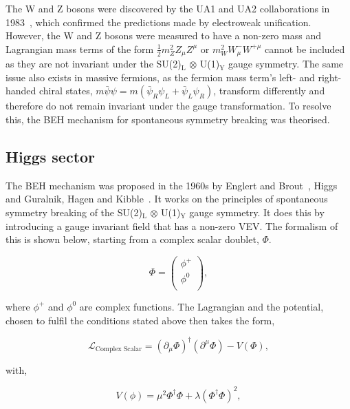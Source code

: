 The W and Z bosons were discovered by the UA1 and UA2 collaborations in 1983~\cite{UA1:1983crd,UA2:1983tsx}, which confirmed the predictions made by electroweak unification.
However, the W and Z bosons were measured to have a non-zero mass and Lagrangian mass terms of the form $\frac{1}{2}m_{Z}^2 Z_{\mu} Z^{\mu}$ or $m_{W}^2 W_{\mu}^{-}W^{+\mu}$ cannot be included as they are not invariant under the SU(2)$_{\text{L}}$ $\otimes$ U(1)$_{\text{Y}}$ gauge symmetry.
The same issue also exists in massive fermions, as the fermion mass term's left- and right-handed chiral states, $m\bar{\psi}\psi = m(\bar{\psi}_R \psi_L + \bar{\psi}_L \psi_R)$,  transform differently and therefore do not remain invariant under the gauge transformation.
To resolve this, the \ac{BEH} mechanism for spontaneous symmetry breaking was theorised.

\subsection{Higgs sector}

The \ac{BEH} mechanism was proposed in the 1960s by Englert and Brout~\cite{Englert:1964et}, Higgs~\cite{Higgs:1964ia,Higgs:1964pj,Higgs:1966ev} and Guralnik, Hagen and Kibble~\cite{Guralnik:1964eu,Kibble:1967sv}.
It works on the principles of spontaneous symmetry breaking of the SU(2)$_{\text{L}}$ $\otimes$ U(1)$_{\text{Y}}$ gauge symmetry.
It does this by introducing a gauge invariant field that has a non-zero \ac{VEV}.
The formalism of this is shown below, starting from a complex scalar doublet, $\Phi$. 

\begin{equation}
	\Phi = 
	\begin{pmatrix} 
		\phi^{+} \\
		\phi^{0} \\
	\end{pmatrix},
\end{equation}

where $\phi^{+}$ and $\phi^{0}$ are complex functions.
The Lagrangian and the potential, chosen to fulfil the conditions stated above then takes the form,

\begin{equation}
	\mathcal{L}_{\text{Complex Scalar}} = (\partial_{\mu}\Phi)^{\dagger} (\partial^{\mu}\Phi) - V(\Phi),
\end{equation}

with,

\begin{equation}
V(\phi) = \mu^2 \Phi^{\dagger} \Phi + \lambda (\Phi^{\dagger} \Phi)^2,
\end{equation}

